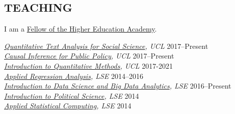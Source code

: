 \documentclass[centered]{res}
\begin{document}
\begin{resume}
\section{TEACHING} 	

\vspace{.5cm}

I am a \href{https://www.advance-he.ac.uk/fellowship/fellowship}{Fellow of the Higher Education Academy}.

{\sl\href{https://uclspp.github.io/PUBLG088/}{Quantitative Text Analysis for Social Science}, UCL} \hfill 2017--Present \\
{\sl\href{https://uclspp.github.io/PUBLG088/}{Causal Inference for Public Policy}, UCL} \hfill 2017--Present \\
{\sl\href{http://uclspp.github.io/PUBLG100/}{Introduction to Quantitative Methods}, UCL} \hfill 2017-2021 \\
{\sl\href{http://www.lse.ac.uk/resources/calendar/courseGuides/MY/2014_MY452.htm}{Applied Regression Analysis}, LSE} \hfill 2014--2016 \\
{\sl\href{http://www.lse.ac.uk/study/summerSchools/Methods/Mathematics-&-Statistics/ME114.aspx}{Introduction to Data Science and Big Data Analytics}, LSE} \hfill 2016--Present \\
{\sl\href{http://www.lse.ac.uk/resources/calendar/courseGuides/GV/2015_GV101.htm}{Introduction to Political Science}, LSE} \hfill 2014 \\	
{\sl\href{http://www.lse.ac.uk/resources/calendar/courseGuides/MY/2014_MY459.htm}{Applied Statistical Computing}, LSE} \hfill 2014 	

%
%
                 

\end{resume}
\end{document}
